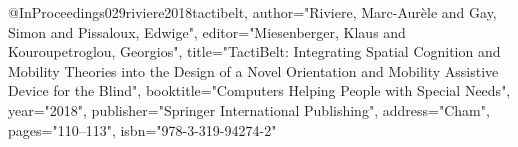 @InProceedings{029riviere2018tactibelt,
author="Riviere, Marc-Aur{\`e}le
and Gay, Simon
and Pissaloux, Edwige",
editor="Miesenberger, Klaus
and Kouroupetroglou, Georgios",
title="TactiBelt: Integrating Spatial Cognition and Mobility Theories into the Design of a Novel Orientation and Mobility Assistive Device for the Blind",
booktitle="Computers Helping People with Special Needs",
year="2018",
publisher="Springer International Publishing",
address="Cham",
pages="110--113",
isbn="978-3-319-94274-2"
}